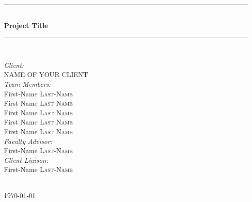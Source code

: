\documentclass{article}
\newcommand{\HRule}{\rule{\linewidth}{0.5mm}} %
\begin{document}
\begin{titlepage}
\HRule \\[0.4cm]
{ \huge \bfseries Project Title}\\[0.2cm] %
\HRule \\[1.0cm]


\begin{minipage}{0.4\textwidth}
\begin{flushleft} \large
\emph{Client:}\\
NAME OF YOUR CLIENT\\[0.5cm]
\emph{Team Members:}\\
First-Name  \textsc{Last-Name}\\ %
First Name  \textsc{Last Name}\\ %
First Name  \textsc{Last Name}\\ %
First Name  \textsc{Last Name}\\ %
First Name  \textsc{Last Name}\\[0.5cm] %
\emph{Faculty Advisor:}\\
First-Name  \textsc{Last-Name}\\[0.5cm] %
\emph{Client Liaison:}\\
First-Name  \textsc{Last-Name}\\[0.5cm] %
\end{flushleft}

\end{minipage}\\[2cm]



{\large \today}\\[2cm] %

\vfill %

\end{titlepage}
\end{document}
